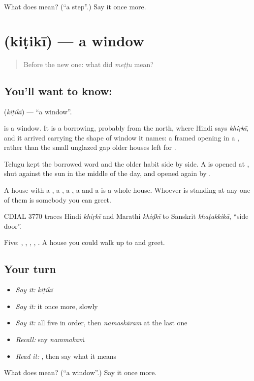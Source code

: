 \begin{tcolorbox}[breakable,colback=teal!4,colframe=teal!35!black,title={Before you move on}]
What does  mean? (\textquotedblleft{}a step\textquotedblright{}.) Say it once more.
\end{tcolorbox}
\section[\texorpdfstring{\te{కిటికీ} (kiṭikī)}{కిటికీ (kiṭikī)}]{ (kiṭikī) — a window}

\label{lesson:TE-C67-window}



\begin{quote}
Before the new one: what did \emph{meṭṭu} mean?
\end{quote}

\subsection*{You'll want to know: }
\textbf{} (\emph{kiṭikī}) — \textquotedblleft{}a window\textquotedblright{}.

 is a window. It is a borrowing, probably from the north, where Hindi says \emph{khiṛkī}, and it arrived carrying the shape of window it names: a framed opening in a , rather than the small unglazed gap older houses left for .

Telugu kept the borrowed word and the older habit side by side. A  is opened at , shut against the sun in the middle of the day, and opened again by .

A house with a , a , a , a  and a  is a whole house. Whoever is standing at any one of them is somebody you can greet.

CDIAL 3770 traces Hindi \emph{khiṛkī} and Marathi \emph{khiḍkī} to Sanskrit \emph{khaṭakkikā}, \textquotedblleft{}side door\textquotedblright{}.

\begin{grammarlens}[title={What you've built}]
Five: , , , , . A house you could walk up to and greet.
\end{grammarlens}

\subsection*{Your turn}
\begin{itemize}
\raggedright
  \item \emph{Say it:} \emph{kiṭikī}
  \item \emph{Say it:} it once more, slowly
  \item \emph{Say it:} all five in order, then \emph{namaskāram} at the last one
  \item \emph{Recall:} say \emph{nammakaṁ}
  \item \emph{Read it:} \textbf{}, then say what it means
\end{itemize}

\begin{tcolorbox}[breakable,colback=teal!4,colframe=teal!35!black,title={Before you move on}]
What does  mean? (\textquotedblleft{}a window\textquotedblright{}.) Say it once more.
\end{tcolorbox}
